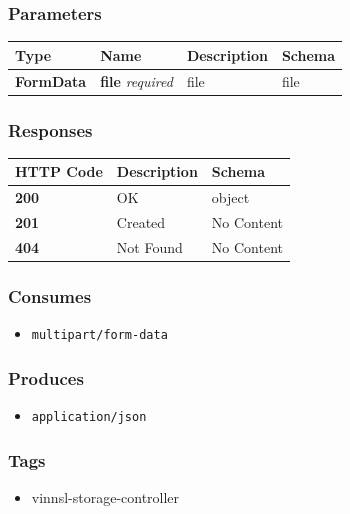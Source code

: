 \subsubsection{Parameters}\label{parameters-18}

\begin{longtable}[]{@{}llll@{}}
\toprule
Type & Name & Description & Schema\tabularnewline
\midrule
\endhead
\textbf{FormData} & \textbf{file} \emph{required} & file &
file\tabularnewline
\bottomrule
\end{longtable}

\subsubsection{Responses}\label{responses-21}

\begin{longtable}[]{@{}lll@{}}
\toprule
HTTP Code & Description & Schema\tabularnewline
\midrule
\endhead
\textbf{200} & OK & object\tabularnewline
\textbf{201} & Created & No Content\tabularnewline
\textbf{404} & Not Found & No Content\tabularnewline
\bottomrule
\end{longtable}

\subsubsection{Consumes}\label{consumes-9}

\begin{itemize}
\tightlist
\item
  \texttt{multipart/form-data}
\end{itemize}

\subsubsection{Produces}\label{produces-21}

\begin{itemize}
\tightlist
\item
  \texttt{application/json}
\end{itemize}

\subsubsection{Tags}\label{tags-21}

\begin{itemize}
\tightlist
\item
  vinnsl-storage-controller
\end{itemize}

